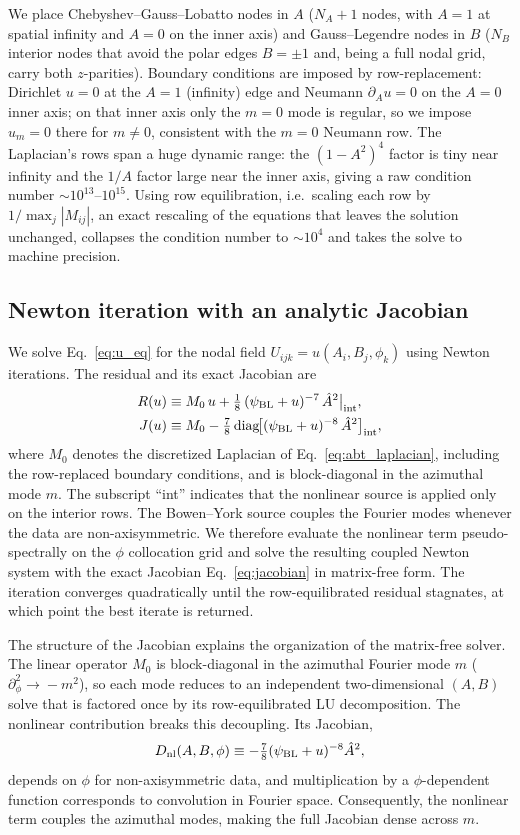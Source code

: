 \documentclass[
  aps,
  prd,
  twocolumn,
  amsmath,
  amssymb,
  nofootinbib,
  superscriptaddress,
  floatfix,
]{revtex4-2}
\newcommand{\psiBL}{\psi_{\mathrm{BL}}}
\newcommand{\Ahat}{\hat{A}}
\begin{document}
We place Chebyshev--Gauss--Lobatto nodes in $A$ ($N_A{+}1$ nodes, with
$A{=}1$ at spatial infinity and $A{=}0$ on the inner axis) and Gauss--Legendre
nodes in $B$ ($N_B$ interior nodes that avoid the polar edges $B=\pm1$ and, being a
full nodal grid, carry both $z$-parities). Boundary conditions are imposed by
row-replacement: Dirichlet $u=0$ at the $A=1$ (infinity) edge and Neumann
$\partial_A u = 0$ on the $A=0$ inner axis; on that inner axis only the $m=0$ mode
is regular, so we impose $u_m=0$ there for $m\neq0$, consistent with the $m=0$
Neumann row. The Laplacian's rows span a huge
dynamic range: the $(1-A^2)^4$ factor is tiny near infinity and the $1/A$ factor
large near the inner axis, giving a raw condition number $\sim10^{13}$--$10^{15}$.
Using row equilibration, i.e.\ scaling each row by $1/\max_j|M_{ij}|$, an exact
rescaling of the equations that leaves the solution unchanged, collapses the
condition number to $\sim10^4$ and takes the solve to machine precision.


\subsection{Newton iteration with an analytic Jacobian}
\label{sec:solve:newton}

We solve Eq.~\eqref{eq:u_eq} for the nodal field
$U_{ijk}=u(A_i,B_j,\phi_k)$ using Newton iterations.
The residual and its exact Jacobian are
\begin{align}
  R(u) &\equiv M_0\,u + \tfrac{1}{8}\,(\psiBL+u)^{-7}\,\Ahat^2 \big|_{\rm int},
  \label{eq:residual}
  \\
  J(u) &\equiv M_0 - \tfrac{7}{8}\,\mathrm{diag}\!\big[(\psiBL+u)^{-8}\,\Ahat^2\big]_{\rm int},
  \label{eq:jacobian}
\end{align}
where $M_0$ denotes the discretized Laplacian of
Eq.~\eqref{eq:abt_laplacian}, including the row-replaced boundary
conditions, and is block-diagonal in the azimuthal mode $m$.
The subscript ``int'' indicates that the nonlinear source is applied only
on the interior rows.
The Bowen--York source couples the Fourier modes whenever the data are
non-axisymmetric. We therefore evaluate the nonlinear term
pseudo-spectrally on the $\phi$ collocation grid and solve the resulting
coupled Newton system with the exact Jacobian
Eq.~\eqref{eq:jacobian} in matrix-free form.
The iteration converges quadratically until the row-equilibrated residual
stagnates, at which point the best iterate is returned.


The structure of the Jacobian explains the organization of the matrix-free
solver. The linear operator $M_0$ is block-diagonal in the azimuthal Fourier
mode $m$ ($\partial_\phi^2\!\rightarrow\!-m^2$), so each mode reduces to an
independent two-dimensional $(A,B)$ solve that is factored once by its
row-equilibrated LU decomposition. The nonlinear contribution breaks this
decoupling. Its Jacobian,
\[
D_{\rm nl}(A,B,\phi)\equiv
-\tfrac78(\psiBL+u)^{-8}\Ahat^2,
\]
depends on $\phi$ for non-axisymmetric data, and multiplication by a
$\phi$-dependent function corresponds to convolution in Fourier space.
Consequently, the nonlinear term couples the azimuthal modes, making the full
Jacobian dense across $m$.
\end{document}
